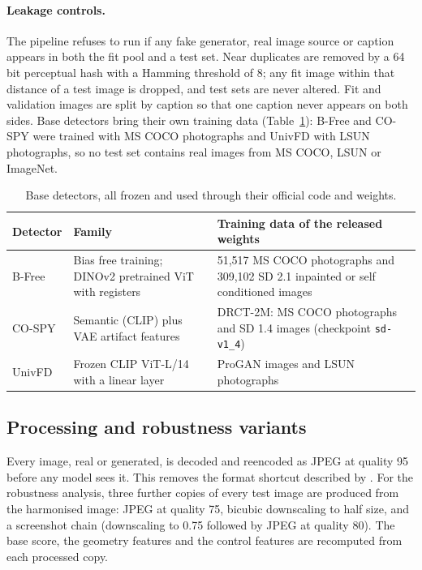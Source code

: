 \documentclass[11pt,a4paper]{article}
\begin{document}
\paragraph{Leakage controls.} The pipeline refuses to run if any fake generator, real image source or caption appears in both the fit pool and a test set. Near duplicates are removed by a 64 bit perceptual hash with a Hamming threshold of 8; any fit image within that distance of a test image is dropped, and test sets are never altered. Fit and validation images are split by caption so that one caption never appears on both sides. Base detectors bring their own training data (Table~\ref{tab:bases}): B-Free and CO-SPY were trained with MS COCO photographs and UnivFD with LSUN photographs, so no test set contains real images from MS COCO, LSUN or ImageNet.

\begin{table}[t]
\centering
\caption{Base detectors, all frozen and used through their official code and weights.}
\label{tab:bases}
\small
\begin{tabularx}{\linewidth}{@{}l X X@{}}
\toprule
Detector & Family & Training data of the released weights \\
\midrule
B-Free \citep{guillaro2025bfree} & Bias free training; DINOv2 pretrained ViT with registers & 51{,}517 MS COCO photographs and 309{,}102 SD 2.1 inpainted or self conditioned images \\
CO-SPY \citep{cheng2025cospy} & Semantic (CLIP) plus VAE artifact features & DRCT-2M: MS COCO photographs and SD 1.4 images (checkpoint \texttt{sd-v1\_4}) \\
UnivFD \citep{ojha2023univfd} & Frozen CLIP ViT-L/14 with a linear layer & ProGAN images and LSUN photographs \\
\bottomrule
\end{tabularx}
\end{table}

\subsection{Processing and robustness variants}
\label{sec:processing}

Every image, real or generated, is decoded and reencoded as JPEG at quality 95 before any model sees it. This removes the format shortcut described by \citet{grommelt2024fake}. For the robustness analysis, three further copies of every test image are produced from the harmonised image: JPEG at quality 75, bicubic downscaling to half size, and a screenshot chain (downscaling to 0.75 followed by JPEG at quality 80). The base score, the geometry features and the control features are recomputed from each processed copy.
\end{document}
